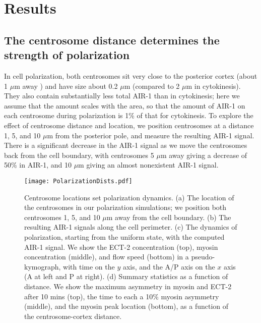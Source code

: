 \documentclass[11pt]{article}
\newcommand{\red}[1]{\color{red}#1\normalcolor}
\begin{document}
\section{Results}
\subsection{The centrosome distance determines the strength of polarization \label{sec:airpol}}
In cell polarization, both centrosomes sit very close to the posterior cortex (about 1 $\mu$m away \citep{cowan2004centrosomes}) and have size about 0.2 $\mu$m \red{(compared to 2 $\mu$m in cytokinesis)}. They also contain substantially less total AIR-1 than in cytokinesis; here we assume that the amount scales with the area, so that the amount of AIR-1 on each centrosome during polarization is 1\% of that for cytokinesis. To explore the effect of centrosome distance and location, we position centrosomes at a distance 1, 5, and 10 $\mu$m from the posterior pole, and measure the resulting AIR-1 signal. There is a significant decrease in the AIR-1 signal as we move the centrosomes back from the cell boundary, with centrosomes 5 $\mu$m away giving a decrease of 50\% in AIR-1, and 10 $\mu$m giving an almost nonexistent AIR-1 signal.

\begin{figure}
\centering
\texttt{[image: PolarizationDists.pdf]}
\caption{\label{fig:PolLoc}Centrosome locations set polarization dynamics. (a) The location of the centrosomes in our polarization simulations; we position both centrosomes 1, 5, and 10 $\mu$m away from the cell boundary. (b) The resulting AIR-1 signals along the cell perimeter. (c) The dynamics of polarization, starting from the uniform state, with the computed AIR-1 signal. We show the ECT-2 concentration (top), myosin concentration (middle), and flow speed (bottom) in a pseudo-kymograph, with time on the $y$ axis, and the A/P axis on the $x$ axis (A at left and P at right). (d) Summary statistics as a function of distance. We show the maximum asymmetry in myosin and ECT-2 after 10 mins (top), the time to each a 10\% myosin asymmetry (middle), and the myosin peak location (bottom), as a function of the centrosome-cortex distance.}
\end{figure}
\end{document}
